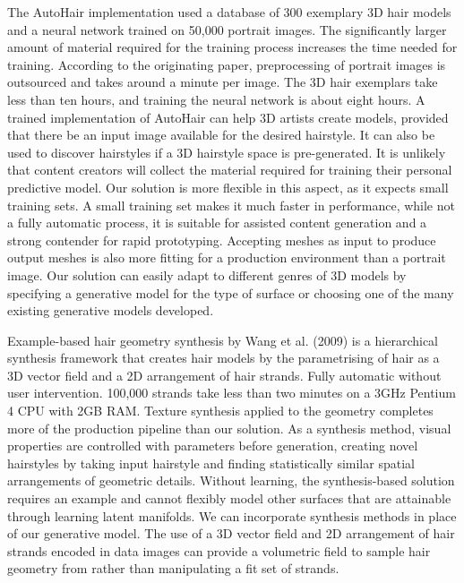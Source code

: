 \documentclass[ %
author={Dillon Keith Diep},
supervisor={Dr. Carl Henrik Ek},
degree={MEng},
title={ART-CG Hair:},
subtitle={Assisted Real-time Content Generation of Stylised Virtual Hair},
type={Research},
year={2017} ]{dissertation}
\begin{document}
The AutoHair implementation used a database of 300 exemplary 3D hair models and a neural network trained on 50,000 portrait images. The significantly larger amount of material required for the training process increases the time needed for training. According to the originating paper, preprocessing of portrait images is outsourced and takes around a minute per image. The 3D hair exemplars take less than ten hours, and training the neural network is about eight hours. A trained implementation of AutoHair can help 3D artists create models, provided that there be an input image available for the desired hairstyle. It can also be used to discover hairstyles if a 3D hairstyle space is pre-generated. It is unlikely that content creators will collect the material required for training their personal predictive model. Our solution is more flexible in this aspect, as it expects small training sets. A small training set makes it much faster in performance, while not a fully automatic process, it is suitable for assisted content generation and a strong contender for rapid prototyping. Accepting meshes as input to produce output meshes is also more fitting for a production environment than a portrait image. Our solution can easily adapt to different genres of 3D models by specifying a generative model for the type of surface or choosing one of the many existing generative models developed.

Example-based hair geometry synthesis by Wang et al. (2009) \cite{examplebasedhair} is a hierarchical synthesis framework that creates hair models by the parametrising of hair as a 3D vector field and a 2D arrangement of hair strands. Fully automatic without user intervention. 100,000 strands take less than two minutes on a 3GHz Pentium 4 CPU with 2GB RAM. Texture synthesis applied to the geometry completes more of the production pipeline than our solution. As a synthesis method, visual properties are controlled with parameters before generation, creating novel hairstyles by taking input hairstyle and finding statistically similar spatial arrangements of geometric details. Without learning, the synthesis-based solution requires an example and cannot flexibly model other surfaces that are attainable through learning latent manifolds. We can incorporate synthesis methods in place of our generative model. The use of a 3D vector field and 2D arrangement of hair strands encoded in data images can provide a volumetric field to sample hair geometry from rather than manipulating a fit set of strands.
\end{document}
